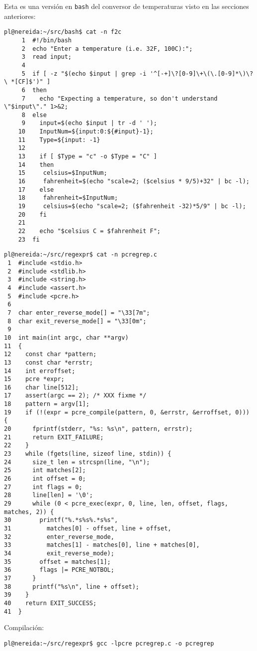 Esta es una versión en \verb|bash| del conversor de temperaturas
visto en las secciones anteriores:

\begin{verbatim}
pl@nereida:~/src/bash$ cat -n f2c
     1  #!/bin/bash
     2  echo "Enter a temperature (i.e. 32F, 100C):";
     3  read input;
     4
     5  if [ -z "$(echo $input | grep -i '^[-+]\?[0-9]\+\(\.[0-9]*\)\?\ *[CF]$')" ]
     6  then
     7    echo "Expecting a temperature, so don't understand \"$input\"." 1>&2;
     8  else
     9    input=$(echo $input | tr -d ' ');
    10    InputNum=${input:0:${#input}-1};
    11    Type=${input: -1}
    12
    13    if [ $Type = "c" -o $Type = "C" ]
    14    then
    15     celsius=$InputNum;
    16     fahrenheit=$(echo "scale=2; ($celsius * 9/5)+32" | bc -l);
    17    else
    18     fahrenheit=$InputNum;
    19     celsius=$(echo "scale=2; ($fahrenheit -32)*5/9" | bc -l);
    20    fi
    21
    22    echo "$celsius C = $fahrenheit F";
    23  fi
\end{verbatim}


\begin{verbatim}
pl@nereida:~/src/regexpr$ cat -n pcregrep.c
 1  #include <stdio.h>
 2  #include <stdlib.h>
 3  #include <string.h>
 4  #include <assert.h>
 5  #include <pcre.h>
 6
 7  char enter_reverse_mode[] = "\33[7m";
 8  char exit_reverse_mode[] = "\33[0m";
 9
10  int main(int argc, char **argv)
11  {
12    const char *pattern;
13    const char *errstr;
14    int erroffset;
15    pcre *expr;
16    char line[512];
17    assert(argc == 2); /* XXX fixme */
18    pattern = argv[1];
19    if (!(expr = pcre_compile(pattern, 0, &errstr, &erroffset, 0))) {
20      fprintf(stderr, "%s: %s\n", pattern, errstr);
21      return EXIT_FAILURE;
22    }
23    while (fgets(line, sizeof line, stdin)) {
24      size_t len = strcspn(line, "\n");
25      int matches[2];
26      int offset = 0;
27      int flags = 0;
28      line[len] = '\0';
29      while (0 < pcre_exec(expr, 0, line, len, offset, flags, matches, 2)) {
30        printf("%.*s%s%.*s%s",
31          matches[0] - offset, line + offset,
32          enter_reverse_mode,
33          matches[1] - matches[0], line + matches[0],
34          exit_reverse_mode);
35        offset = matches[1];
36        flags |= PCRE_NOTBOL;
37      }
38      printf("%s\n", line + offset);
39    }
40    return EXIT_SUCCESS;
41  }
\end{verbatim}
Compilación:
\begin{verbatim}
pl@nereida:~/src/regexpr$ gcc -lpcre pcregrep.c -o pcregrep
\end{verbatim}

